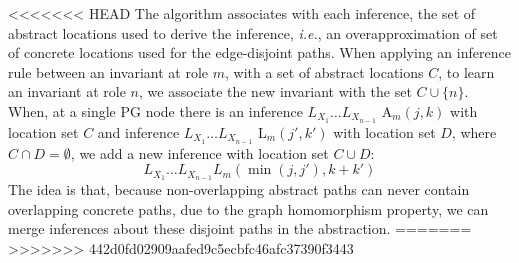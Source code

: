 \documentclass[numbers, 10pt, preprint]{sigplanconf}
\newcommand{\IE}{\emph{i.e.}}
\begin{document}
<<<<<<< HEAD
The algorithm associates with each inference, the set of abstract locations used to derive the inference, \IE, an overapproximation of set of concrete locations used for the edge-disjoint paths. When applying an inference rule between an invariant at role $m$, with a set of abstract locations $C$, to learn an invariant at role $n$, we associate the new invariant with the set $C \cup \{ n \}$.
%
When, at a single PG node there is an inference $L_{X_1} \dots L_{X_{n-1}}$ A$_m(j,k)$ with location set $C$ and inference $L_{X_1} \dots L_{X_{n-1}}$ L$_m(j',k')$ with location set $D$, where $C \cap D = \emptyset$, we add a new inference with location set $C \cup D$:
%
$$L_{X_1} \dots L_{X_{n-1}} L_m(\min(j, j'), k + k')$$
%
\noindent
The idea is that, because non-overlapping abstract paths can never contain overlapping concrete paths, due to the graph homomorphism property, we can merge inferences about these disjoint paths in the abstraction.
=======
%
%
%
>>>>>>> 442d0fd02909aafed9c5ecbfc46afc37390f3443
\end{document}
